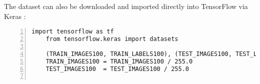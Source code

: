 The dataset can also be downloaded and imported directly into TensorFlow via Keras \cite{kaggle.21.09.2020}:

\begin{code}
    
\begin{lstlisting}[language=MyPython, numbers=left,label={src:cifarimport}]
    import tensorflow as tf
    from tensorflow.keras import datasets
    
    (TRAIN_IMAGES100, TRAIN_LABELS100), (TEST_IMAGES100, TEST_LABELS100) = tf.keras.datasets.cifar100.load_data()
	TRAIN_IMAGES100 = TRAIN_IMAGES100 / 255.0
    TEST_IMAGES100  = TEST_IMAGES100 / 255.0
    
\end{lstlisting}
  \caption{Load and normalise the data set \ac{cifar}-100}
\end{code}

